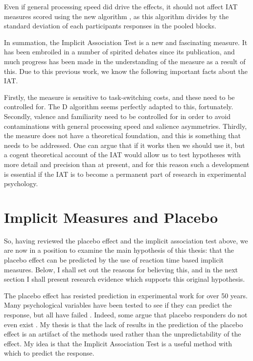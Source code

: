 Even if general processing speed did drive the effects, it should not affect IAT measures scored using the new algorithm \cite{Greenwald2003a}, as this algorithm divides by the standard deviation of each participants responses in the pooled blocks.  


In summation, the Implicit Association Test is a new and fascinating measure. It has been embroiled in a number of spirited debates since its publication, and much progress has been made in the understanding of the measure as a result of this. Due to this previous work, we know the following important facts about the IAT. 

Firstly, the measure is sensitive to task-switching costs, and these need to be controlled for. The D algorithm seems perfectly adapted to this, fortunately. Secondly, valence and familiarity need to be controlled for in order to avoid contaminations with general processing speed and salience asymmetries. Thirdly, the measure does not have a theoretical foundation, and this is something that needs to be addressed. One can argue that if it works then we should use it, but a cogent theoretical account of the IAT would allow us to test hypotheses with more detail and precision than at present, and for this reason such a development is essential if the IAT is to become a permanent part of research in experimental psychology.

\section{Implicit Measures and Placebo}

So, having reviewed the placebo effect and the implicit association test above, we are now in a position to examine the main hypothesis of this thesis: that the placebo effect can be predicted by the use of reaction time based implicit measures. Below, I shall set out the reasons for believing this, and in the next section I shall present research evidence which supports this original hypothesis. 

The placebo effect has resisted prediction in experimental work for over 50 years. Many psychological variables have been tested to see if they can predict the response, but all have failed \cite{Shapiro1997}. Indeed, some argue that placebo responders do not even exist \cite{Kaptchuk2008a}. My thesis is that the lack of results in the prediction of the placebo effect is an artifact of the methods used rather than the unpredictability of the effect. My idea is that the Implicit Association Test is a useful method with which to predict the response. 


